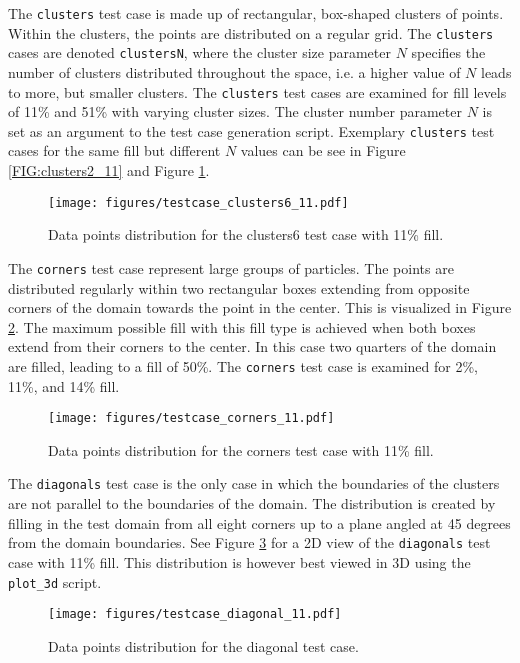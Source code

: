 The \texttt{clusters} test case is made up of rectangular, box-shaped clusters of points. Within the clusters, the points are distributed on a regular grid. The \texttt{clusters} cases are denoted \texttt{clustersN}, where the cluster size parameter $N$ specifies the number of clusters distributed throughout the space, i.e. a higher value of $N$ leads to more, but smaller clusters. The \texttt{clusters} test cases are examined for fill levels of 11\% and 51\% with varying cluster sizes. The cluster number parameter $N$ is set as an argument to the test case generation script. Exemplary \texttt{clusters} test cases for the same fill but different $N$ values can be see in Figure \ref{FIG:clusters2_11} and Figure \ref{FIG:clusters6_11}. 

\begin{figure}[h]
	\centering
	\texttt{[image: figures/testcase\_clusters6\_11.pdf]}
	\caption{Data points distribution for the clusters6 test case with 11\% fill.}
	\label{FIG:clusters6_11}
\end{figure}

The \texttt{corners} test case represent large groups of particles. The points are distributed regularly within two rectangular boxes extending from opposite corners of the domain towards the point in the center. This is visualized in Figure \ref{FIG:corners_11}. The maximum possible fill with this fill type is achieved when both boxes extend from their corners to the center. In this case two quarters of the domain are filled, leading to a fill of 50\%. The \texttt{corners} test case is examined for 2\%, 11\%, and 14\% fill.

\begin{figure}[h]
	\centering
	\texttt{[image: figures/testcase\_corners\_11.pdf]}
	\caption{Data points distribution for the corners test case with 11\% fill.}
	\label{FIG:corners_11}
\end{figure}

The \texttt{diagonals} test case is the only case in which the boundaries of the clusters are not parallel to the boundaries of the domain. The distribution is created by filling in the test domain from all eight corners up to a plane angled at 45 degrees from the domain boundaries. See Figure \ref{FIG:diagonals_11} for a 2D view of the \texttt{diagonals} test case with 11\% fill. This distribution is however best viewed in 3D using the \texttt{plot\_3d} script.

\begin{figure}[h]
	\centering
	\texttt{[image: figures/testcase\_diagonal\_11.pdf]}
	\caption{Data points distribution for the diagonal test case.}
	\label{FIG:diagonals_11}
\end{figure}

